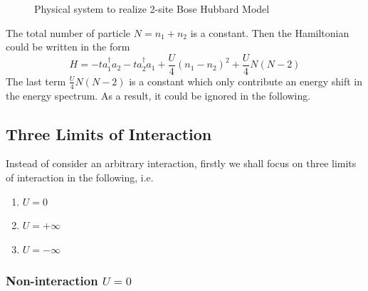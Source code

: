 \begin{figure}[htbp]
\centering
{}
\caption{Physical system to realize 2-site Bose Hubbard Model}
\label{fig:1-7}
\end{figure}

The total number of particle $N = n_1 + n_2$ is a constant.
Then the Hamiltonian could be written in the form
\begin{equation}
H = -t a_1^\dag a_2 -t a_2^\dag a_1+\frac{U}{4}(n_1-n_2)^2+\frac{U}{4}N(N-2)
\end{equation}
The last term $\frac{U}{4}N(N-2)$ is a constant which only contribute an energy shift in the energy spectrum. As a result, it could be ignored in the following.

\subsection{Three Limits of Interaction}
Instead of consider an arbitrary interaction, firstly we shall focus on three limits of interaction in the following, i.e.
\begin{enumerate}
\item $U=0$
\item $U=+\infty$
\item $U=-\infty$
\end{enumerate}

\subsubsection{Non-interaction $U = 0$}

